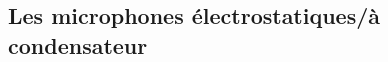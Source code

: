\documentclass[
  letterpaper,
  DIV=11,
  numbers=noendperiod]{scrreprt}
\begin{document}
\hypertarget{les-microphones-uxe9lectrostatiquesuxe0-condensateur}{%
\subsection{Les microphones électrostatiques/à
condensateur}\label{les-microphones-uxe9lectrostatiquesuxe0-condensateur}}

\begin{figure}

\begin{minipage}[t]{0.33\linewidth}

{\centering 


}

\end{minipage}%
%
\begin{minipage}[t]{0.33\linewidth}

{\centering 

\raisebox{-\height}{

}}
\end{minipage}
\end{figure}
\end{document}
